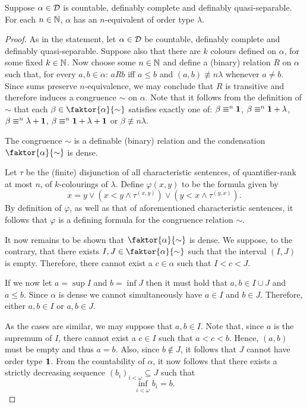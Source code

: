 \begin{thm}
	Suppose $\alpha\in\mathcal{D}$ is countable, definably complete and definably
	quasi-separable.  For each $n\in\mathbb{N}$, $\alpha$ has an $n$-equivalent of order
	type $\lambda$.
\end{thm}
\begin{proof}
	As in the statement, let $\alpha\in\mathcal{D}$ be countable, definably complete
	and definably quasi-separable.  Suppose also that there are $k$ colours defined
	on $\alpha$, for some fixed $k\in\mathbb{N}$.  Now choose some $n\in\mathbb{N}$ and define
	a (binary) relation $R$ on $\alpha$ such that, for every $a,b\in\alpha$:  $aRb$
	iff $a\leq b$ and $(a,b)\nequiv{n}\lambda$ whenever $a\neq b$.  Since sums
	preserve $n$-equivalence, we may conclude that $R$ is transitive and therefore
	induces a congruence $\sim$ on $\alpha$.  Note that it follows from the
	definition of $\sim$ that each $\beta\in\faktor{\alpha}{\sim}$ satisfies exactly
	one of: $\beta\equiv^{n}\mathbf{1}$, $\beta\equiv^{n}\mathbf{1}+\lambda$,
	$\beta\equiv^{n}\lambda+\mathbf{1}$, $\beta\equiv^{n}\mathbf{1}+\lambda+\mathbf{1}$ or
	$\beta\nequiv{n}\lambda$.

	\begin{claim}
		The congruence $\sim$ is a definable (binary) relation and the
		condensation $\faktor{\alpha}{\sim}$ is dense.
	\end{claim}
	Let $\tau$ be the (finite) disjunction of all characteristic sentences, of
	quantifier-rank at most $n$, of $k$-colourings of $\lambda$.  Define
	$\varphi(x,y)$ to be the formula given by
	\begin{equation}\label{eq:condef}
		x=y\vee(x<y\wedge\tau^{(x,y)})\vee(y<x\wedge\tau^{(y,x)}).
	\end{equation}
	By definition of $\varphi$, as well as that of aforementioned characteristic
	sentences, it follows that $\varphi$ is a defining formula for the
	congruence relation $\sim$.

	It now remains to be shown that $\faktor{\alpha}{\sim}$ is dense.  We
	suppose, to the contrary, that there exists $I,J\in\faktor{\alpha}{\sim}$ such
	that the interval $(I,J)$ is empty.  Therefore, there cannot exist a
	$c\in\alpha$ such that $I<c<J$.

	If we now let $a=\sup I$ and $b=\inf J$ then it must hold that
	$a,b\in I\cup J$ and $a\leq b$.  Since $\alpha$ is dense we cannot
	simultaneously have $a\in I$ and $b\in J$.  Therefore, either $a,b\in I$ or
	$a,b\in J$.

	As the cases are similar, we may suppose that $a,b\in I$.  Note that, since
	$a$ is the supremum of $I$, there cannot exist a $c\in I$ such that $a<c<b$.
	Hence, $(a,b)$ must be empty and thus $a=b$.  Also, since $b\notin J$, it
	follows that $J$ cannot have order type $\mathbf{1}$.  From the countability of
	$\alpha$, it now follows that there exists a strictly decreasing sequence
	$(b_{i})_{i<\omega}\subseteq J$ such that
	\begin{equation}
		\inf_{i<\omega}b_{i}=b.
	\end{equation}


\end{proof}

